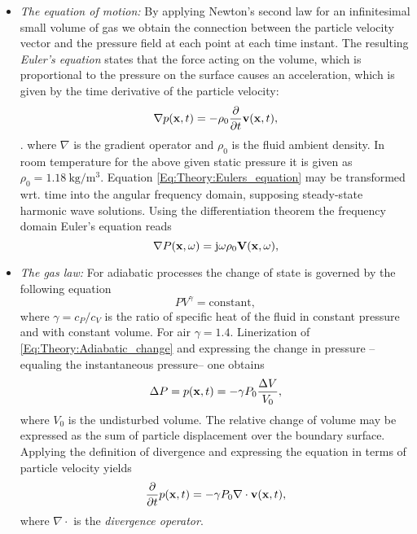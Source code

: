 \begin{itemize}
\item \emph{The equation of motion:} By applying Newton's second law for an infinitesimal small volume of gas we obtain the connection between the particle velocity vector and the pressure field at each point at each time instant. The resulting \emph{Euler's equation} states that the force acting on the volume, which is proportional to the pressure on the surface causes an acceleration, which is given by the time derivative of the particle velocity:
\begin{equation}
\nabla p(\mathbf{x},t) = -\rho_0 \frac{\partial}{\partial t} \mathbf{v}(\mathbf{x},t),
\label{Eq:Theory:Eulers_equation}
\end{equation}
.
%
where $\nabla$ is the gradient operator and $\rho_0$ is the fluid ambient density. In room temperature for the above given static pressure it is given as $\rho_0 = 1.18~\mathrm{kg}/\mathrm{m}^3$.
Equation \eqref{Eq:Theory:Eulers_equation} may be transformed wrt. time into the angular frequency domain, supposing steady-state harmonic wave solutions. Using the differentiation theorem the frequency domain Euler's equation reads
\begin{equation}
\nabla P(\mathbf{x},\omega) = \mathrm{j} \omega \rho_0 \mathbf{V}(\mathbf{x},\omega),
\label{Eq:Theory:Freq_Eulers_equation}
\end{equation}

\item \emph{The gas law:} For adiabatic processes the change of state is governed by the following equation
\begin{equation}
P V^{\gamma} = \mathrm{constant},
\label{Eq:Theory:Adiabatic_change}
\end{equation}
where $\gamma = c_P/c_V$ is the ratio of specific heat of the fluid in constant pressure and with constant volume. For air $\gamma = 1.4$. Linerization of \eqref{Eq:Theory:Adiabatic_change} and expressing the change in pressure --equaling the instantaneous pressure-- one obtains
\begin{equation}
\Delta P = p(\mathbf{x},t) = -\gamma P_0 \frac{\Delta V}{V_0},
\end{equation}
where $V_0$ is the undisturbed volume. The relative change of volume may be expressed as the sum of particle displacement over the boundary surface. Applying the definition of divergence and expressing the equation in terms of particle velocity yields
\begin{equation}
\frac{\partial}{\partial t} p(\mathbf{x},t) = -\gamma P_0 \nabla \cdot \mathbf{v}(\mathbf{x},t),
\label{Eq:Theory:Second_eq}
\end{equation}
where $\nabla \cdot$ is the \emph{divergence operator}.
\end{itemize}
